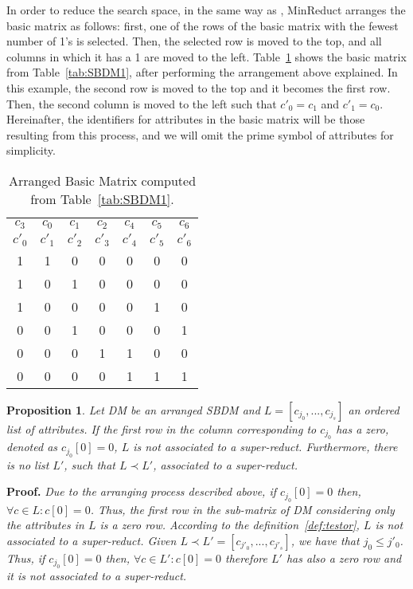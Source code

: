 \documentclass[authoryear,preprint,review,12pt]{elsarticle}
\newtheorem{proposition}{Proposition}
\begin{document}
	\label{arrange}
	In order to reduce the search space, in the same way as \citep{Sanchez07,Lias13}, MinReduct arranges the basic matrix as follows: first, one of the rows of the basic matrix with the fewest number of 1's is selected. Then, the selected row is moved to the top, and all columns in which it has a 1 are moved to the left. Table~\ref{tab:SSBDM1} shows the basic matrix from Table~\ref{tab:SBDM1}, after performing the arrangement above explained. In this example, the second row is moved to the top and it becomes the first row. Then, the second column is moved to the left such that $c'_0 = c_1$ and $c'_1 = c_0$. Hereinafter, the identifiers for attributes in the basic matrix will be those resulting from this process, and we will omit the prime symbol of attributes for simplicity.
			
	\begin{table}[htb]
		\caption{Arranged Basic Matrix computed from Table~\ref{tab:SBDM1}.}
		\centering
		\begin{tabular}{ccccccc}\label{tab:SSBDM1}
			$c_3$ & $c_0$ & $c_1$ & $c_2$ & $c_4$ & $c_5$ & $c_6$\\
			$c'_0$ & $c'_1$ & $c'_2$ & $c'_3$ & $c'_4$ & $c'_5$ & $c'_6$\\
			\hline
			1&1&0&0&0&0&0\\
			1&0&1&0&0&0&0\\
			1&0&0&0&0&1&0\\
			0&0&1&0&0&0&1\\
			0&0&0&1&1&0&0\\
			0&0&0&0&1&1&1\\
		\end{tabular}             
	\end{table}  
	
	\begin{proposition}\label{prop:firstRow}
		Let DM be an arranged SBDM and $L = [c_{j_0},...,c_{j_s}]$ an ordered list of attributes. If the first row in the column corresponding to $c_{j_0}$ has a zero, denoted as $c_{j_0}[0]=0$, $L$ is not associated to a super-reduct. Furthermore, there is no list $L'$, such that $L\prec L'$, associated to a super-reduct.
	\end{proposition}
	
	\noindent
	\textbf{Proof.} \textit{Due to the arranging process described above, if $c_{j_0}[0]=0$ then, $\forall c \in L: c[0]=0$. Thus, the first row in the sub-matrix of DM considering only the attributes in $L$ is a zero row. According to the definition~\ref{def:testor}, $L$ is not associated to a super-reduct. Given $L \prec L'= [c_{j'_0},...,c_{j'_s}]$, we have that $j_0 \leq j'_0$. Thus, if $c_{j_0}[0]=0$ then, $\forall c \in L': c[0]=0$ therefore $L'$ has also a zero row and it is not associated to a super-reduct.}
	
\end{document}
